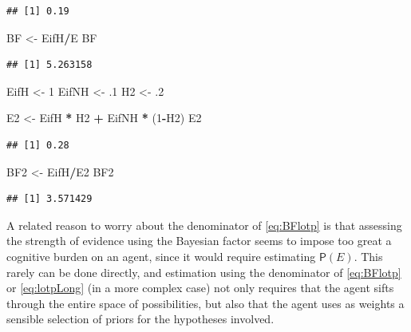 \documentclass[10pt,dvipsnames,enabledeprecatedfontcommands]{scrartcl}
\newenvironment{Shaded}{\begin{snugshade}}{\end{snugshade}}
\newcommand{\DecValTok}[1]{\textcolor[rgb]{0.00,0.00,0.81}{#1}}
\newcommand{\FloatTok}[1]{\textcolor[rgb]{0.00,0.00,0.81}{#1}}
\newcommand{\StringTok}[1]{\textcolor[rgb]{0.31,0.60,0.02}{#1}}
\newcommand{\OperatorTok}[1]{\textcolor[rgb]{0.81,0.36,0.00}{\textbf{#1}}}
\newcommand{\NormalTok}[1]{#1}
\newcommand{\pr}[1]{\mathsf{P}(#1)}
\begin{document}
\begin{verbatim}
## [1] 0.19
\end{verbatim}

\begin{Shaded}
\begin{Highlighting}[]
\NormalTok{BF <-}\StringTok{ }\NormalTok{EifH}\OperatorTok{/}\NormalTok{E}
\NormalTok{BF}
\end{Highlighting}
\end{Shaded}

\begin{verbatim}
## [1] 5.263158
\end{verbatim}

\begin{Shaded}
\begin{Highlighting}[]
\NormalTok{EifH <-}\StringTok{ }\DecValTok{1}
\NormalTok{EifNH <-}\StringTok{ }\FloatTok{.1}
\NormalTok{H2 <-}\StringTok{ }\FloatTok{.2}

\NormalTok{E2 <-}\StringTok{ }\NormalTok{EifH }\OperatorTok{*}\StringTok{ }\NormalTok{H2 }\OperatorTok{+}\StringTok{ }\NormalTok{EifNH }\OperatorTok{*}\StringTok{ }\NormalTok{(}\DecValTok{1}\OperatorTok{-}\NormalTok{H2)}
\NormalTok{E2}
\end{Highlighting}
\end{Shaded}

\begin{verbatim}
## [1] 0.28
\end{verbatim}

\begin{Shaded}
\begin{Highlighting}[]
\NormalTok{BF2 <-}\StringTok{ }\NormalTok{EifH}\OperatorTok{/}\NormalTok{E2}
\NormalTok{BF2}
\end{Highlighting}
\end{Shaded}

\begin{verbatim}
## [1] 3.571429
\end{verbatim}

\normalsize 

\noindent A related reason to worry about the denominator of
\eqref{eq:BFlotp} is that assessing the strength of evidence using the
Bayesian factor seems to impose too great a cognitive burden on an
agent, since it would require estimating \(\pr{E}\). This rarely can be
done directly, and estimation using the denominator of \eqref{eq:BFlotp}
or \eqref{eq:lotpLong} (in a more complex case) not only requires that
the agent sifts through the entire space of possibilities, but also that
the agent uses as weights a sensible selection of priors for the
hypotheses involved.
\end{document}
